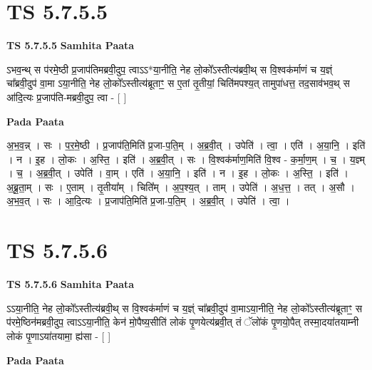 \documentclass[17pt]{extarticle}
\begin{document}

\section{ TS 5.7.5.5 }

\textbf{TS 5.7.5.5 } \newline
\textbf{Samhita Paata} \newline

ऽभव॒न्थ् स प॑रमे॒ष्ठी प्र॒जाप॑तिमब्रवी॒दुप॒ त्वाऽऽ*या॒नीति॒ नेह लो॒को᳚ऽस्तीत्य॑ब्रवी॒थ् स वि॒श्वक॑र्माणं च य॒ज्ञ्ं चा᳚ब्रवी॒दुप॑ वा॒मा ऽया॒नीति॒ नेह लो॒को᳚ऽस्तीत्य॑ब्रूताꣳ॒॒ स ए॒तां तृ॒तीयां॒ चिति॑मपश्य॒त् तामुपा॑धत्त॒ तद॒साव॑भव॒थ् स आ॑दि॒त्यः प्र॒जाप॑ति-मब्रवी॒दुप॒ त्वा - [  ] \newline

\textbf{Pada Paata} \newline

अ॒भ॒व॒न्न् । सः । प॒र॒मे॒ष्ठी । प्र॒जाप॑ति॒मिति॑ प्र॒जा-प॒ति॒म् । अ॒ब्र॒वी॒त् । उपेति॑ । त्वा॒ । एति॑ । अ॒या॒नि॒ । इति॑ । न । इ॒ह । लो॒कः । अ॒स्ति॒ । इति॑ । अ॒ब्र॒वी॒त् । सः । वि॒श्वक॑र्माण॒मिति॑ वि॒श्व - क॒र्मा॒ण॒म् । च॒ । य॒ज्ञ्म् । च॒ । अ॒ब्र॒वी॒त् । उपेति॑ । वा॒म् । एति॑ । अ॒या॒नि॒ । इति॑ । न । इ॒ह । लो॒कः । अ॒स्ति॒ । इति॑ । अ॒ब्रू॒ता॒म् । सः । ए॒ताम् । तृ॒तीया᳚म् । चिति᳚म् । अ॒प॒श्य॒त् । ताम् । उपेति॑ । अ॒ध॒त्त॒ । तत् । अ॒सौ । अ॒भ॒व॒त् । सः । आ॒दि॒त्यः । प्र॒जाप॑ति॒मिति॑ प्र॒जा-प॒ति॒म् । अ॒ब्र॒वी॒त् । उपेति॑ । त्वा॒ ।  \newline





\section{ TS 5.7.5.6 }

\textbf{TS 5.7.5.6 } \newline
\textbf{Samhita Paata} \newline

ऽऽया॒नीति॒ नेह लो॒को᳚ऽस्तीत्य॑ब्रवी॒थ् स वि॒श्वक॑र्माणं च य॒ज्ञ्ं चा᳚ब्रवी॒दुप॑ वा॒माऽया॒नीति॒ नेह लो॒को᳚ऽस्तीत्य॑ब्रूताꣳ॒॒ स प॑रमे॒ष्ठिन॑मब्रवी॒दुप॒ त्वाऽऽया॒नीति॒ केन॑ मो॒पैष्य॒सीति॑ लोकं पृ॒णयेत्य॑ब्रवी॒त् तं ॅलो॑कं पृ॒णयो॒पैत् तस्मा॒दया॑तयाम्नी लोकं पृ॒णाऽया॑तयामा॒ ह्य॑सा - [  ] \newline

\textbf{Pada Paata} \newline
\end{document}
